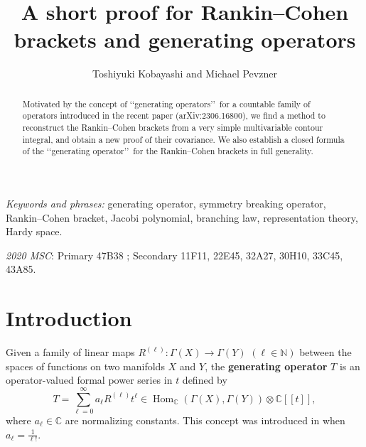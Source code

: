 \documentclass[12pt]{amsart}
\theoremstyle{plain} %
\theoremstyle{definition} %
\theoremstyle{remark} %
\begin{document}
\title{A short proof for Rankin--Cohen brackets and generating operators}
\author{Toshiyuki Kobayashi and Michael Pevzner } %
\maketitle %
\thispagestyle{empty}
%

\begin{abstract}
Motivated by the concept of 
\lq\lq{generating operators}\rq\rq\
 for a countable family of operators
 introduced in the recent paper (arXiv:2306.16800), 
 we find a method to reconstruct the Rankin--Cohen brackets from a very simple multivariable contour integral, 
 and obtain a new proof of their covariance.  
We also establish a closed formula
 of the \lq\lq{generating operator}\rq\rq\ for the Rankin--Cohen brackets
 in full generality.  
\end{abstract}

\noindent
\textit{Keywords and phrases:}
generating operator, symmetry breaking operator, 
Rankin--Cohen bracket, Jacobi polynomial,
 branching law, representation theory, 
 Hardy space.  

\medskip
\noindent
\textit{2020 MSC}:
Primary
47B38%
;
Secondary
11F11, %
22E45, %
32A27, %
30H10, %
33C45, %
43A85.%

\section{Introduction}
\label{sec:intro}
Given a family of linear maps
 $R^{(\ell)} \colon \Gamma(X) \to \Gamma(Y)$ $(\ell \in {\mathbb{N}})$
 between the spaces of functions on two manifolds $X$ and $Y$, 
 the {\bf{generating operator}} $T$
 is an operator-valued
 formal power series in $t$ defined by 
\begin{equation}
\label{eqn:genop}
  T=\sum_{\ell=0}^{\infty} a_{\ell}R^{(\ell)} t^{\ell}
  \in \operatorname{Hom}_{\mathbb{C}}(\Gamma(X), \Gamma(Y)) \otimes {\mathbb{C}}[[t]], 
\end{equation}
where $a_{\ell} \in {\mathbb{C}}$ are normalizing constants.  
This concept was introduced in \cite{KPgen}
 when $a_{\ell}=\frac{1}{\ell !}$.  
\end{document}
